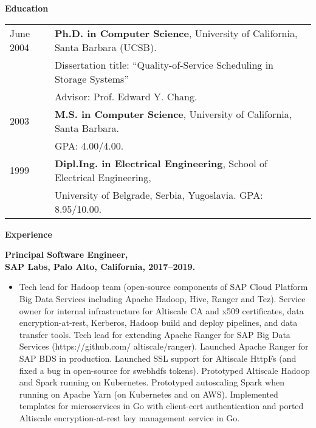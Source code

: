 \documentclass[10pt]{article}
\renewcommand{\section}[1]{ \vspace{10pt}\begin{flushleft}{\hspace{-0.2in }\Large\bf
    #1}\end{flushleft}\nopagebreak }
\begin{document}
\section{Education}

\begin{tabular}{ll}
June 2004 \hspace{0.16in}	& \textbf{Ph.D. in Computer Science}, 
		University of California, Santa Barbara (UCSB). \\
        & Dissertation title: ``Quality-of-Service Scheduling in Storage Systems''\\
	&  Advisor: { Prof. Edward Y. Chang}. \\

2003		& \textbf{M.S. in Computer Science}, 
		University of California, Santa Barbara.\\ & GPA: 4.00/4.00. \\
1999 		& \textbf{Dipl.Ing. in Electrical Engineering}, 
		School of Electrical Engineering,\\
 & 		University of Belgrade, Serbia, Yugoslavia. GPA: 8.95/10.00.
\end{tabular}

\section{Experience}

{\bf Principal Software Engineer,\\
SAP Labs, Palo Alto, California, 2017--2019.}
\begin{itemize}
\vspace{-5pt}
\item
Tech lead for Hadoop team (open-source components of SAP Cloud Platform Big Data Services including Apache Hadoop, 
Hive, Ranger and Tez). 
Service owner for internal infrastructure for Altiscale CA and x509 certificates, data encryption-at-rest, 
Kerberos, Hadoop build and deploy pipelines, and data transfer tools.
Tech lead for extending Apache Ranger for SAP Big Data Services (https://github.com/ altiscale/ranger). 
Launched Apache Ranger for SAP BDS in production. Launched SSL support for Altiscale HttpFs (and fixed a bug in open-source for swebhdfs tokens). 
Prototyped Altiscale Hadoop and Spark running on Kubernetes. Prototyped autoscaling Spark when running on 
Apache Yarn (on Kubernetes and on AWS). Implemented templates for microservices in Go with client-cert authentication and
ported Altiscale encryption-at-rest key management service in Go. 
\end{itemize}
\end{document}

